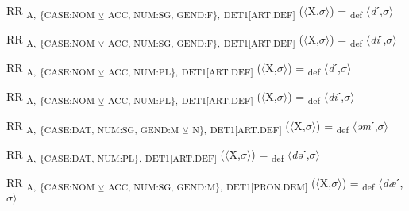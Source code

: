 {\begin{exe}
 RR \textsubscript{A,} \textsubscript{\{CASE:NOM} \textsubscript{${\veebar}$}\textsubscript{ ACC, NUM:SG, GEND:F\},} \textsubscript{DET1[ART.DEF]} ($\langle$X,$\sigma $$\rangle$) = \textsubscript{def} $\langle$\textit{d}ˊ,$\sigma $$\rangle$
\end{exe}

\begin{exe}
 RR \textsubscript{A,} \textsubscript{\{CASE:NOM} \textsubscript{${\veebar}$}\textsubscript{ ACC, NUM:SG, GEND:F\},} \textsubscript{DET1[ART.DEF]} ($\langle$X,$\sigma $$\rangle$) = \textsubscript{def} $\langle$\textit{di}ˊ,$\sigma $$\rangle$
\end{exe}

\begin{exe}
 RR \textsubscript{A,} \textsubscript{\{CASE:NOM} \textsubscript{${\veebar}$}\textsubscript{ ACC, NUM:PL\},} \textsubscript{DET1[ART.DEF]} ($\langle$X,$\sigma $$\rangle$) = \textsubscript{def} $\langle$\textit{d}ˊ,$\sigma $$\rangle$
\end{exe}

\begin{exe}
 RR \textsubscript{A,} \textsubscript{\{CASE:NOM} \textsubscript{${\veebar}$}\textsubscript{ ACC, NUM:PL\},} \textsubscript{DET1[ART.DEF]} ($\langle$X,$\sigma $$\rangle$) = \textsubscript{def} $\langle$\textit{di}ˊ,$\sigma $$\rangle$
\end{exe}

\begin{exe}
 RR \textsubscript{A,} \textsubscript{\{CASE:DAT, NUM:SG, GEND:M} \textsubscript{${\veebar}$}\textsubscript{ N\},} \textsubscript{DET1[ART.DEF]} ($\langle$X,$\sigma $$\rangle$) = \textsubscript{def} $\langle$\textit{əm}ˊ,$\sigma $$\rangle$
\end{exe}

\begin{exe}
 RR \textsubscript{A,} \textsubscript{\{CASE:DAT, NUM:PL\},} \textsubscript{DET1[ART.DEF]} ($\langle$X,$\sigma $$\rangle$) = \textsubscript{def} $\langle$\textit{də}ˊ,$\sigma $$\rangle$
\end{exe}

\begin{exe}
 RR \textsubscript{A,} \textsubscript{\{CASE:NOM} \textsubscript{${\veebar}$}\textsubscript{ ACC, NUM:SG, GEND:M\},} \textsubscript{DET1[PRON.DEM]} ($\langle$X,$\sigma $$\rangle$) = \textsubscript{def} $\langle$\textit{dæ}ˊ,$\sigma $$\rangle$
\end{exe}

}
